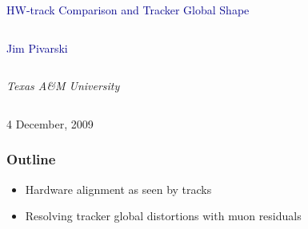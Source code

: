 \documentclass[compress]{beamer}
\begin{document}
\begin{frame}
\vfill
\begin{center}
\textcolor{darkblue}{\Large HW-track Comparison and Tracker Global Shape}

\vfill
\begin{columns}
\begin{center}
\large
\textcolor{darkblue}{Jim Pivarski}
\end{center}
\end{columns}

\begin{columns}
\begin{center}
\scriptsize
{\it Texas A\&M University}
\end{center}
\end{columns}

\vfill
 4 December, 2009

\end{center}
\end{frame}


\small

\begin{frame}
\frametitle{Outline}
\begin{itemize}\setlength{\itemsep}{0.75 cm}
\item Hardware alignment as seen by tracks
\item Resolving tracker global distortions with muon residuals
\end{itemize}
\end{frame}
\end{document}
